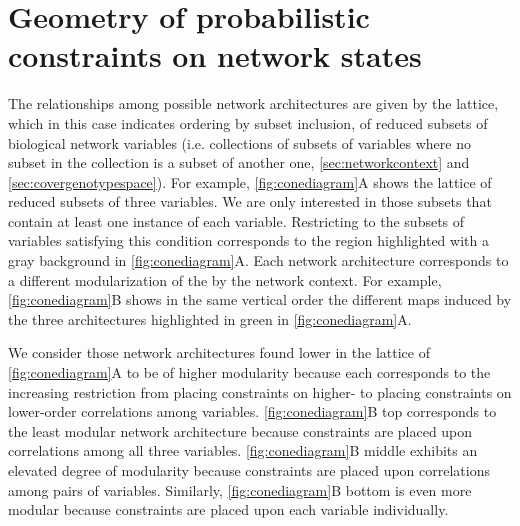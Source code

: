 \section{Geometry of probabilistic constraints on network states}\label{sec:probconstrgeometry}
The relationships among possible network architectures are given by the lattice, which in this case indicates ordering by subset inclusion, of reduced subsets of biological network variables (i.e. collections of subsets of variables where no subset in the collection is a subset of another one, \ref{sec:networkcontext} and  \ref{sec:covergenotypespace}). For example, \ref{fig:conediagram}A shows the lattice of reduced subsets of three variables. We are only interested in those subsets that contain at least one instance of each variable. Restricting to the subsets of variables satisfying this condition corresponds to the region highlighted with a gray background in \ref{fig:conediagram}A. Each network architecture corresponds to a different modularization of the \gnpm{} by the network context. For example, \ref{fig:conediagram}B shows in the same vertical order the different maps induced by the three architectures highlighted in green in \ref{fig:conediagram}A.

We consider those network architectures found lower in the lattice of \ref{fig:conediagram}A to be of higher modularity because each corresponds to the increasing restriction from placing constraints on higher- to placing constraints on lower-order correlations among variables. \ref{fig:conediagram}B top corresponds to the least modular network architecture because constraints are placed upon correlations among all three variables. \ref{fig:conediagram}B middle exhibits an elevated degree of modularity because constraints are placed upon correlations among pairs of variables. Similarly, \ref{fig:conediagram}B bottom is even more modular because constraints are placed upon each variable individually.

